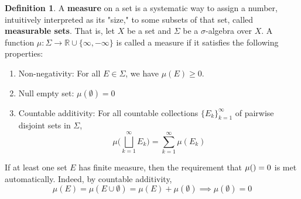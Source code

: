 \documentclass{article}
\theoremstyle{remark}
\theoremstyle{definition}
\newtheorem{definition}{Definition}[section]
\begin{document}
\begin{definition}
A \textbf{measure} on a set is a systematic way to assign a number, intuitively interpreted as its "size," to some subsets of that set, called \textbf{measurable sets}. That is, let $X$ be a set and $\Sigma$ be a $\sigma$-algebra over $X$. A function $\mu: \Sigma \longrightarrow \mathbb{R} \cup \{\infty, -\infty\}$ is called a measure if it satisfies the following properties: 
\begin{enumerate}
    \item Non-negativity: For all $E \in \Sigma$, we have $\mu (E) \geq 0$. 
    \item Null empty set: $\mu (\emptyset) = 0$
    \item Countable additivity: For all countable collections $\{E_k\}_{k=1}^\infty$ of pairwise disjoint sets in $\Sigma$, 
    \[\mu \bigg( \bigsqcup_{k=1}^\infty E_k \bigg) = \sum_{k=1}^\infty \mu (E_k)\]
\end{enumerate}
If at least one set $E$ has finite measure, then the requirement that $\mu (\empty) = 0$ is met automatically. Indeed, by countable additivity, 
\[\mu(E) = \mu(E \cup \emptyset) = \mu(E) + \mu(\emptyset) \implies \mu(\emptyset) = 0\]
\end{definition}
\end{document}
